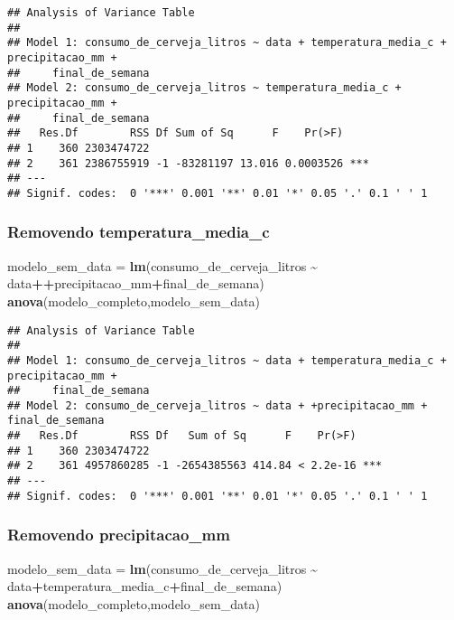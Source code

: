 \documentclass[
]{article}
\newenvironment{Shaded}{\begin{snugshade}}{\end{snugshade}}
\newcommand{\FunctionTok}[1]{\textcolor[rgb]{0.13,0.29,0.53}{\textbf{#1}}}
\newcommand{\NormalTok}[1]{#1}
\newcommand{\OtherTok}[1]{\textcolor[rgb]{0.56,0.35,0.01}{#1}}
\newcommand{\SpecialCharTok}[1]{\textcolor[rgb]{0.81,0.36,0.00}{\textbf{#1}}}
\begin{document}
\begin{verbatim}
## Analysis of Variance Table
## 
## Model 1: consumo_de_cerveja_litros ~ data + temperatura_media_c + precipitacao_mm + 
##     final_de_semana
## Model 2: consumo_de_cerveja_litros ~ temperatura_media_c + precipitacao_mm + 
##     final_de_semana
##   Res.Df        RSS Df Sum of Sq      F    Pr(>F)    
## 1    360 2303474722                                  
## 2    361 2386755919 -1 -83281197 13.016 0.0003526 ***
## ---
## Signif. codes:  0 '***' 0.001 '**' 0.01 '*' 0.05 '.' 0.1 ' ' 1
\end{verbatim}

\hypertarget{removendo-temperatura_media_c}{%
\subsubsection{Removendo
temperatura\_media\_c}\label{removendo-temperatura_media_c}}

\begin{Shaded}
\begin{Highlighting}[]
\NormalTok{modelo\_sem\_data }\OtherTok{=} \FunctionTok{lm}\NormalTok{(consumo\_de\_cerveja\_litros }\SpecialCharTok{\textasciitilde{}}\NormalTok{ data}\SpecialCharTok{++}\NormalTok{precipitacao\_mm}\SpecialCharTok{+}\NormalTok{final\_de\_semana)}
\FunctionTok{anova}\NormalTok{(modelo\_completo,modelo\_sem\_data)}
\end{Highlighting}
\end{Shaded}

\begin{verbatim}
## Analysis of Variance Table
## 
## Model 1: consumo_de_cerveja_litros ~ data + temperatura_media_c + precipitacao_mm + 
##     final_de_semana
## Model 2: consumo_de_cerveja_litros ~ data + +precipitacao_mm + final_de_semana
##   Res.Df        RSS Df   Sum of Sq      F    Pr(>F)    
## 1    360 2303474722                                    
## 2    361 4957860285 -1 -2654385563 414.84 < 2.2e-16 ***
## ---
## Signif. codes:  0 '***' 0.001 '**' 0.01 '*' 0.05 '.' 0.1 ' ' 1
\end{verbatim}

\hypertarget{removendo-precipitacao_mm}{%
\subsubsection{Removendo
precipitacao\_mm}\label{removendo-precipitacao_mm}}

\begin{Shaded}
\begin{Highlighting}[]
\NormalTok{modelo\_sem\_data }\OtherTok{=} \FunctionTok{lm}\NormalTok{(consumo\_de\_cerveja\_litros }\SpecialCharTok{\textasciitilde{}}\NormalTok{ data}\SpecialCharTok{+}\NormalTok{temperatura\_media\_c}\SpecialCharTok{+}\NormalTok{final\_de\_semana)}
\FunctionTok{anova}\NormalTok{(modelo\_completo,modelo\_sem\_data)}
\end{Highlighting}
\end{Shaded}
\end{document}
